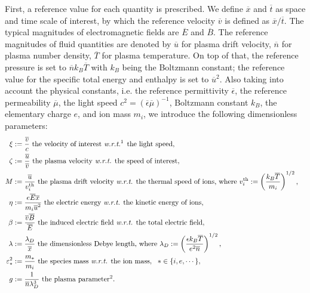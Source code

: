 \documentclass{article}
\begin{document}
First, a reference value for each quantity is prescribed. We define $\overline{x}$ and $\overline{t}$ as space and time scale of interest, by which the reference velocity $\overline{v}$ is defined as $\overline{x}/\overline{t}$. The typical magnitudes of electromagnetic fields are $\overline{E}$ and $\overline{B}$. The reference magnitudes of fluid quantities are denoted by $\overline{u}$ for plasma drift velocity, $\overline{n}$ for plasma number density, $\overline{T}$ for plasma temperature. On top of that, the reference pressure is set to $\overline{n}k_B\overline{T}$ with $k_B$ being the Boltzmann constant; the reference value for the specific total energy and enthalpy is set to $\overline{u}^2$. Also taking into account the physical constants, i.e. the reference permittivity $\overline{\epsilon}$, the reference permeability $\overline{\mu}$, the light speed $c^2 = (\overline{\epsilon}\overline{\mu})^{-1}$, Boltzmann constant $k_B$, the elementary charge $e$, and ion mass $m_i$, we introduce the following dimensionless parameters:
\begin{align*} 
    \xi &:= \frac{\overline{v}}{c} \text{ the velocity of interest \emph{w.r.t.}\footnotemark[1] the light speed}, &\\
    \zeta &:= \frac{\overline{u}}{\overline{v}} \text{ the plasma velocity \emph{w.r.t.} the speed of interest}, &\\
    M &:= \frac{\overline{u}}{v_i^{\text{th}}} \text{ the plasma drift velocity \emph{w.r.t.} the thermal speed of ions, where } v_i^{\text{th}} := \left(\frac{k_B \overline{T}}{m_i}\right)^{1/2}, &\\
    \eta &:= \frac{e\overline{E}\overline{x}}{m_i\overline{u}^2} \text{ the electric energy \emph{w.r.t.} the kinetic energy of ions}, &\\
    \beta &:= \frac{\overline{v}\overline{B}}{\overline{E}} \text{ the induced electric field \emph{w.r.t.} the total electric field}, &\\
    \lambda &:= \frac{\lambda_D}{\overline{x}} \text{ the dimensionless Debye length, where }\lambda_D := \left(\frac{\epsilon k_B\overline{T}}{e^2\overline{n}}\right)^{1/2}, &\\
    \varepsilon_*^2 &:= \frac{m_*}{m_i} \text{ the species mass \emph{w.r.t.} the ion mass},\ \  * \in \{i,e,\cdots\}, &\\
    g &:= \frac{1}{\overline{n}\lambda_D^3} \text{ the plasma parameter\footnotemark[2]}.&
\end{align*}
\end{document}
